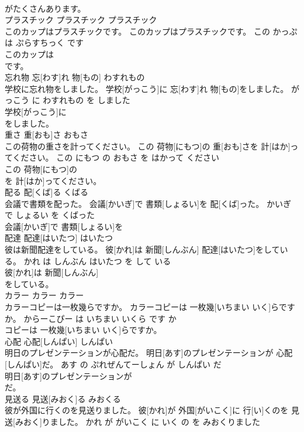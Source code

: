 \documentclass[8pt]{extreport}
\begin{document}
\begin{CJK}{UTF8}{min}
\\	がたくさんあります。			
\\	プラスチック	プラスチック	プラスチック	
\\	このカップはプラスチックです。	このカップはプラスチックです。	この かっぷ は ぷらすちっく です	
\\	このカップは
\\	です。			
\\	忘れ物	忘[わす]れ 物[もの]	わすれもの	
\\	学校に忘れ物をしました。	学校[がっこう]に 忘[わす]れ 物[もの]をしました。	がっこう に わすれもの を しました	
\\	学校[がっこう]に
\\	をしました。			
\\	重さ	重[おも]さ	おもさ	
\\	この荷物の重さを計ってください。	この 荷物[にもつ]の 重[おも]さを 計[はか]ってください。	この にもつ の おもさ を はかって ください	
\\	この 荷物[にもつ]の
\\	を 計[はか]ってください。			
\\	配る	配[くば]る	くばる	
\\	会議で書類を配った。	会議[かいぎ]で 書類[しょるい]を 配[くば]った。	かいぎ で しょるい を くばった	
\\	会議[かいぎ]で 書類[しょるい]を
\\	配達	配達[はいたつ]	はいたつ	
\\	彼は新聞配達をしている。	彼[かれ]は 新聞[しんぶん] 配達[はいたつ]をしている。	かれ は しんぶん はいたつ を して いる	
\\	彼[かれ]は 新聞[しんぶん]
\\	をしている。			
\\	カラー	カラー	カラー	
\\	カラーコピーは一枚幾らですか。	カラーコピーは 一枚幾[いちまい いく]らですか。	からーこぴー は いちまい いくら です か	
\\	コピーは 一枚幾[いちまい いく]らですか。			
\\	心配	心配[しんぱい]	しんぱい	
\\	明日のプレゼンテーションが心配だ。	明日[あす]のプレゼンテーションが 心配[しんぱい]だ。	あす の ぷれぜんてーしょん が しんぱい だ	
\\	明日[あす]のプレゼンテーションが
\\	だ。			
\\	見送る	見送[みおく]る	みおくる	
\\	彼が外国に行くのを見送りました。	彼[かれ]が 外国[がいこく]に 行[い]くのを 見送[みおく]りました。	かれ が がいこく に いく の を みおくりました	

\end{CJK}
\end{document}
